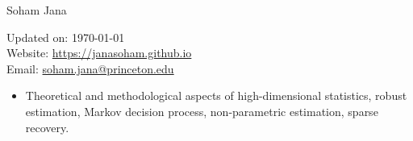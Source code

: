 \documentclass[letterpaper,11pt,oneside]{article}
\theoremstyle{definition}
\begin{document}
	
	
	\noindent  \Huge{Soham Jana} \\
	\vspace{1ex} 
	\normalsize
	
	\hfill
	\begin{minipage}{2.6in}
	Updated on: \today \\
	Website: \href{https://janasoham.github.io/}{https://janasoham.github.io}\\
	Email: \href{mailto:soham.jana@princeton.edu}{soham.jana@princeton.edu}
	\end{minipage}
	\vspace{1cm}
	
	
	
	
	
	
	\begin{itemize}
		\item[] Theoretical and methodological aspects of high-dimensional statistics, robust estimation, Markov decision process, non-parametric estimation, sparse recovery.
	\end{itemize}

	
\end{document}
